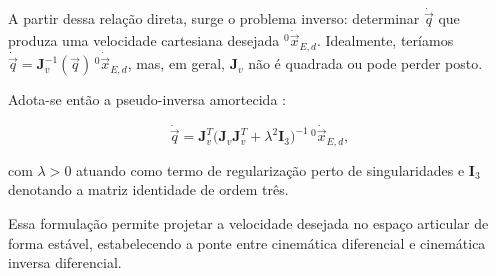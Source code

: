 A partir dessa relação direta, surge o problema inverso: determinar $\dot{\vec{q}}$ que produza uma velocidade cartesiana desejada ${}^{0}\!\dot{\vec{x}}_{E,d}$.
Idealmente, teríamos
$\dot{\vec{q}} = \mathbf{J}_{v}^{-1}(\vec q)\,{}^{0}\!\dot{\vec{x}}_{E,d}$,
mas, em geral, $\mathbf{J}_{v}$ não é quadrada ou pode perder posto.

Adota-se então a pseudo-inversa amortecida \cite{sciavicco_siciliano2010}:

\begin{equation}
\label{eq:pseudoinversa_preIK}
\dot{\vec{q}}
=
\mathbf{J}_{v}^{T}
\bigl(
\mathbf{J}_{v}\mathbf{J}_{v}^{T}
+
\lambda^{2}\mathbf{I}_{3}
\bigr)^{-1}
\,{}^{0}\!\dot{\vec{x}}_{E,d},
\end{equation}

com $\lambda > 0$ atuando como termo de regularização perto de singularidades e $\mathbf{I}_{3}$ denotando a matriz identidade de ordem três.


Essa formulação permite projetar a velocidade desejada no espaço articular de forma estável, estabelecendo a ponte entre cinemática diferencial e cinemática inversa diferencial.
